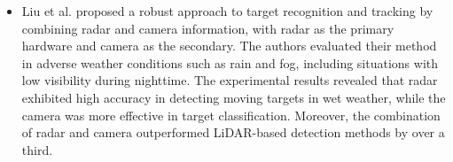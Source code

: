 \documentclass[rnd]{mas_proposal}
\begin{document}
\begin{itemize}
      \item Liu et al. \cite{liu2021robust} proposed a robust approach to target recognition and tracking by combining radar and camera information, with radar as the primary hardware and camera as the secondary. The authors evaluated their method in adverse weather conditions such as rain and fog, including situations with low visibility during nighttime. The experimental results revealed that radar exhibited high accuracy in detecting moving targets in wet weather, while the camera was more effective in target classification. Moreover, the combination of radar and camera outperformed LiDAR-based detection methods by over a third.


\end{itemize}
\end{document}
